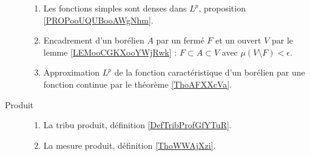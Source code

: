 \begin{description}
\begin{enumerate}
			\item
			      Les fonctions simples sont denses dans \( L^p\), proposition \ref{PROPooUQUBooAWgNhm}.
			\item
			      Encadrement d'un borélien \( A\) par un fermé \( F\) et un ouvert \( V\) par le lemme \ref{LEMooCGKXooYWjRwk} : \( F\subset A\subset V\) avec \( \mu(V\setminus F)<\epsilon\).
			\item
			      Approximation \( L^p\) de la fonction caractéristique d'un borélien par une fonction continue par le théorème \ref{ThoAFXXcVa}.
		\end{enumerate}
	\item[Produit]
		\begin{enumerate}
			\item
			      La tribu produit, définition \ref{DefTribProfGfYTuR}.
			\item
			      La mesure produit, définition \ref{ThoWWAjXzi}.
		\end{enumerate}
\end{description}
